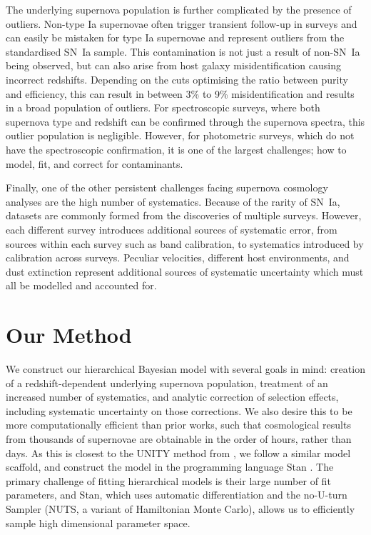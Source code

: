 \documentclass[a4paper,fleqn,usenatbib]{mnras}
\newcommand{\green}{\color{forestgreen}}
\newcommand{\rubin}{\citetalias{Rubin2015}}
\begin{document}
The underlying supernova population is further complicated by the presence of outliers. Non-type Ia supernovae often trigger transient follow-up in surveys and can easily be mistaken for type Ia supernovae {\green and represent outliers from the standardised SN~Ia sample.} This contamination is not just a result of non-SN~Ia being observed, but can also arise from host galaxy misidentification causing incorrect redshifts. Depending on the cuts {\green optimising the} ratio between purity and efficiency, this can result in between 3\% to 9\% misidentification \citep{Gupta2016} and results in a broad population of outliers. For spectroscopic surveys, where both supernova type and redshift can be confirmed through the supernova spectra, this outlier population is negligible. However, for photometric surveys, which do not have the spectroscopic confirmation, it is one of the largest challenges; how to model, fit, and correct for contaminants.

Finally, one of the other persistent challenges facing supernova cosmology analyses are the high number of systematics. Because of the rarity of SN~Ia, datasets are commonly formed from the discoveries of multiple surveys. However, each different survey introduces additional sources of systematic error, from sources within each survey such as band calibration, to systematics introduced by calibration across surveys. Peculiar velocities, different host environments, and dust extinction represent additional sources of systematic uncertainty which must all be modelled and accounted for. 



\section{Our Method}
\label{sec:method}

We construct our hierarchical Bayesian model with several goals in mind: creation of a redshift-dependent underlying supernova population, {\green treatment of an increased number of systematics}, and analytic correction of selection effects, including systematic uncertainty on those corrections. We also desire this to be more computationally efficient than prior works, such that cosmological results from thousands of supernovae are obtainable in the order of hours, rather than days. As this is closest to the UNITY method from \citet[][hereafter denoted \rubin]{Rubin2015}, we follow a similar model scaffold, and construct the model in the programming language Stan \citep{Carpenter2017, StanDevelopmentTeam2017}. The primary challenge of fitting hierarchical models is their large number of fit parameters, and Stan, which uses automatic differentiation and the no-U-turn Sampler (NUTS, a variant of Hamiltonian Monte Carlo), allows us to efficiently sample high dimensional parameter space.
\end{document}
